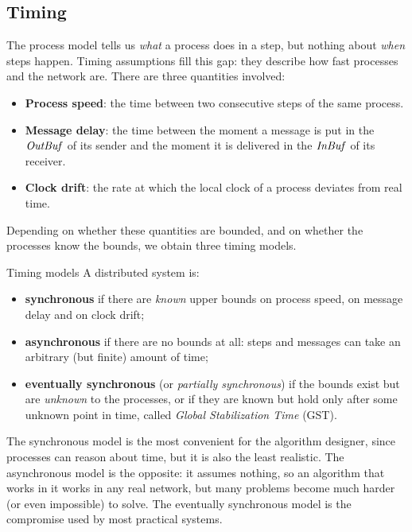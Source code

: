 \subsection{Timing}

The process model tells us \textit{what} a process does in a step, but nothing about \textit{when} steps happen. Timing assumptions fill this gap: they describe how fast processes and the network are. There are three quantities involved:
\begin{itemize}
  \item \textbf{Process speed}: the time between two consecutive steps of the same process.
  \item \textbf{Message delay}: the time between the moment a message is put in the $\mathit{OutBuf}$ of its sender and the moment it is delivered in the $\mathit{InBuf}$ of its receiver.
  \item \textbf{Clock drift}: the rate at which the local clock of a process deviates from real time.
\end{itemize}

Depending on whether these quantities are bounded, and on whether the processes know the bounds, we obtain three timing models.

\begin{frameddefn}[label={def:timing-models}]{Timing models}
  A distributed system is:
  \begin{itemize}
    \item \textbf{synchronous} if there are \textit{known} upper bounds on process speed, on message delay and on clock drift;
    \item \textbf{asynchronous} if there are no bounds at all: steps and messages can take an arbitrary (but finite) amount of time;
    \item \textbf{eventually synchronous} (or \textit{partially synchronous}) if the bounds exist but are \textit{unknown} to the processes, or if they are known but hold only after some unknown point in time, called \textit{Global Stabilization Time} (GST).
  \end{itemize}
\end{frameddefn}

The synchronous model is the most convenient for the algorithm designer, since processes can reason about time, but it is also the least realistic. The asynchronous model is the opposite: it assumes nothing, so an algorithm that works in it works in any real network, but many problems become much harder (or even impossible) to solve. The eventually synchronous model is the compromise used by most practical systems.

